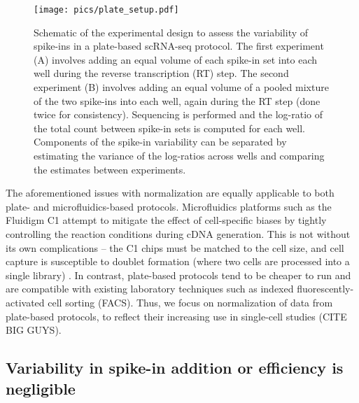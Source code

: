 \documentclass{article}
\begin{document}

\begin{figure}[H]
\begin{center}
\texttt{[image: pics/plate\_setup.pdf]}
\end{center}
\caption{Schematic of the experimental design to assess the variability of spike-ins in a plate-based scRNA-seq protocol.
The first experiment (A) involves adding an equal volume of each spike-in set into each well during the reverse transcription (RT) step.
The second experiment (B) involves adding an equal volume of a pooled mixture of the two spike-ins into each well, again during the RT step (done twice for consistency).
Sequencing is performed and the log-ratio of the total count between spike-in sets is computed for each well.
Components of the spike-in variability can be separated by estimating the variance of the log-ratios across wells and comparing the estimates between experiments.
}
\label{fig:expdesign}
\end{figure}

The aforementioned issues with normalization are equally applicable to both plate- and microfluidics-based protocols.
Microfluidics platforms such as the Fluidigm C1 \cite{pollen2014lowcoverage} attempt to mitigate the effect of cell-specific biases by tightly controlling the reaction conditions during cDNA generation.
This is not without its own complications -- the C1 chips must be matched to the cell size, and cell capture is susceptible to doublet formation (where two cells are processed into a single library) \cite{fluidigm2016white}.
In contrast, plate-based protocols tend to be cheaper to run and are compatible with existing laboratory techniques such as indexed fluorescently-activated cell sorting (FACS).
Thus, we focus on normalization of data from plate-based protocols, to reflect their increasing use in single-cell studies (CITE BIG GUYS).


\subsection{Variability in spike-in addition or efficiency is negligible}
\end{document}
